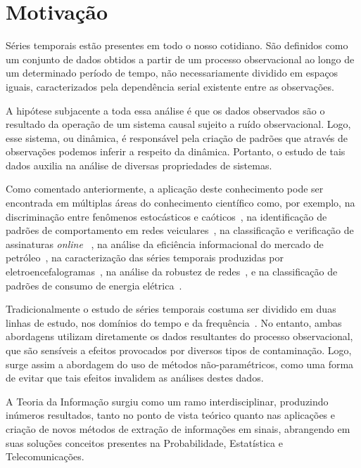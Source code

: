  

\section{Motivação}

Séries temporais estão presentes em todo o nosso cotidiano. São definidos como um conjunto de dados obtidos a partir de um processo observacional ao longo de um determinado período de tempo, não necessariamente dividido em espaços iguais, caracterizados pela dependência serial existente entre as observações.

A hipótese subjacente a toda essa análise é que os dados observados são o resultado da operação de um sistema causal sujeito a ruído observacional. Logo, esse sistema, ou dinâmica, é responsável pela criação de padrões que através de observações podemos inferir a respeito da dinâmica. Portanto, o estudo de tais dados auxilia na análise de diversas propriedades de sistemas. 

Como comentado anteriormente, a aplicação deste conhecimento pode ser encontrada em múltiplas áreas do conhecimento científico como, por exemplo, 
na discriminação entre fenômenos estocásticos e caóticos~\citep{DistinguishingNoiseFromChaos}, 
na identificação de padrões de comportamento em redes veiculares~\citep{CharacterizationVehicleBehaviorInformationTheory}, 
na classificação e verificação de assinaturas \textit{online} ~\citep{ClassificationVerificationOnlineHandwrittenSignatures},
na análise da eficiência informacional do mercado de petróleo~\citep{oilMarket},
na caracterização das séries temporais produzidas por eletroencefalogramas~\citep{EGGTimeSeries},
na análise da robustez de redes~\citep{InformationTheoryPerspectiveNetworkRobustness}, e 
na classificação de padrões de consumo de energia elétrica~\citep{CharacterizationElectricLoadInformationTheoryQuantifiers}.

Tradicionalmente o estudo de séries temporais costuma ser dividido em duas linhas de estudo, nos domínios do tempo e da frequência~\citep{BrockwellDavis91}. No entanto, ambas abordagens utilizam diretamente os dados resultantes do processo observacional, que são sensíveis a efeitos provocados por diversos tipos de contaminação. Logo, surge assim a abordagem do uso de métodos não-paramétricos, como uma forma de evitar que tais efeitos invalidem as análises destes dados.

A Teoria da Informação surgiu como um ramo interdisciplinar, produzindo inúmeros resultados, tanto no ponto de vista teórico quanto nas aplicações e criação de novos métodos de extração de informações em sinais, abrangendo em suas soluções conceitos presentes na Probabilidade, Estatística e Telecomunicações. 

